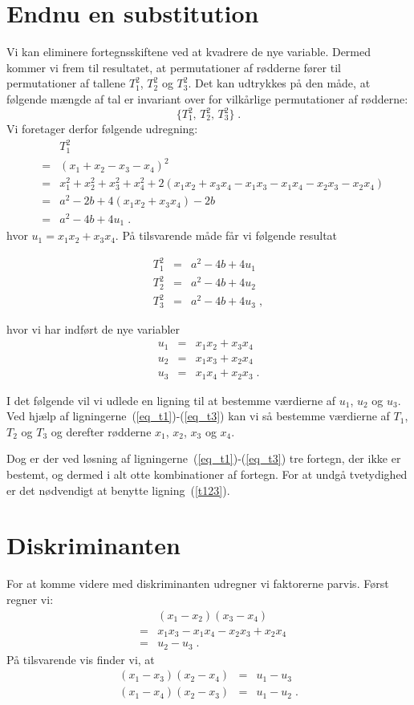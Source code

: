 \documentclass[12pt,oneside,a4paper]{article}
\newcommand{\bas}{\begin{eqnarray*}}
\newcommand{\eas}{\end{eqnarray*}}
\newcommand{\bea}{\begin{eqnarray}}
\newcommand{\eea}{\end{eqnarray}}
\begin{document}
\section{Endnu en substitution}
Vi kan eliminere fortegnsskiftene ved at kvadrere de nye variable. Dermed
kommer vi frem til resultatet, at permutationer af rødderne fører til
permutationer af tallene $T_1^2$, $T_2^2$ og $T_3^2$. Det kan udtrykkes på den
måde, at følgende mængde af tal er invariant over for vilkårlige permutationer
af rødderne:
\begin{equation}
    \{T_1^2,\, T_2^2,\, T_3^2\}\;.
    \label{n_set}
\end{equation}
Vi foretager derfor følgende udregning:
\bas
&& T_1^2 \\
&=& (x_1+x_2-x_3-x_4)^2 \\
&=& x_1^2+x_2^2+x_3^2+x_4^2 + 2(x_1x_2+x_3x_4-x_1x_3-x_1x_4-x_2x_3-x_2x_4) \\
&=& a^2-2b + 4(x_1x_2+x_3x_4) - 2b \\
&=& a^2-4b + 4u_1 \;.
\eas
hvor $u_1 = x_1x_2+x_3x_4$.
På tilsvarende måde får vi følgende resultat
\begin{tcolorbox}
\bea
T_1^2 &=& a^2-4b + 4u_1 \label{eq_t1}\\
T_2^2 &=& a^2-4b + 4u_2 \label{eq_t2}\\
T_3^2 &=& a^2-4b + 4u_3 \label{eq_t3}\;,
\eea
\end{tcolorbox}
hvor vi har indført de nye variabler
\bea
u_1 &=& x_1x_2 + x_3x_4 \label{eq_u1_def}\\
u_2 &=& x_1x_3 + x_2x_4 \label{eq_u2_def}\\
u_3 &=& x_1x_4 + x_2x_3 \label{eq_u3_def}\;.
\eea

I det følgende vil vi udlede en ligning til at bestemme værdierne af $u_1$,
$u_2$ og $u_3$. Ved hjælp af ligningerne~(\ref{eq_t1})-(\ref{eq_t3}) kan vi 
så bestemme værdierne af $T_1$, $T_2$ og $T_3$ og derefter rødderne $x_1$, 
$x_2$, $x_3$ og $x_4$.

Dog er der ved løsning af ligningerne~(\ref{eq_t1})-(\ref{eq_t3}) tre fortegn,
der ikke er bestemt, og dermed i alt otte kombinationer af fortegn.
For at undgå tvetydighed er det nødvendigt at benytte ligning~(\ref{t123}).

\section{Diskriminanten}
For at komme videre med diskriminanten udregner vi faktorerne parvis.
Først regner vi:
\bea
&& (x_1-x_2)(x_3-x_4) \\
&=& x_1x_3-x_1x_4-x_2x_3+x_2x_4 \\
&=& u_2 - u_3\;.
\eea
På tilsvarende vis finder vi, at 
\bea
(x_1-x_3)(x_2-x_4) &=& u_1 - u_3 \\
(x_1-x_4)(x_2-x_3) &=& u_1 - u_2 \;.
\eea
\end{document}
